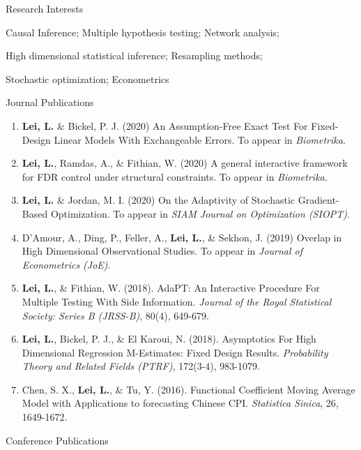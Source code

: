\documentclass{article}
\begin{document}
\begin{large}
\noindent Research Interests
\end{large}

\vspace{3mm}
Causal Inference; Multiple hypothesis testing; Network analysis; 

High dimensional statistical inference; Resampling methods;

Stochastic optimization; Econometrics

\vspace{3mm}

\begin{large}
\noindent Journal Publications
\end{large}

\begin{enumerate}
\item \textbf{Lei, L.} \& Bickel, P. J. (2020) An Assumption-Free Exact Test For Fixed-Design Linear Models With Exchangeable Errors. To appear in \emph{Biometrika}.
\item \textbf{Lei, L.}, Ramdas, A., \& Fithian, W. (2020) A general interactive framework for FDR control under structural constraints. To appear in \emph{Biometrika}.
\item \textbf{Lei, L.} \& Jordan, M. I. (2020) On the Adaptivity of Stochastic Gradient-Based Optimization. To appear in \emph{SIAM Journal on Optimization (SIOPT)}.
\item D'Amour, A., Ding, P., Feller, A., \textbf{Lei, L.}, \& Sekhon, J. (2019) Overlap in High Dimensional Observational Studies. To appear in \emph{Journal of Econometrics (JoE)}.
\item \textbf{Lei, L.}, \& Fithian, W. (2018). AdaPT: An Interactive Procedure For Multiple Testing With Side Information. \emph{Journal of the Royal Statistical Society: Series B (JRSS-B)}, 80(4), 649-679.
\item \textbf{Lei, L.}, Bickel, P. J., \& El Karoui, N. (2018). Asymptotics For High Dimensional Regression M-Estimates: Fixed Design Results. \emph{Probability Theory and Related Fields (PTRF)}, 172(3-4), 983-1079.
\item Chen, S. X., \textbf{Lei, L.}, \& Tu, Y. (2016). Functional Coefficient Moving Average Model with Applications to forecasting Chinese CPI. \emph{Statistica Sinica}, 26, 1649-1672.
\end{enumerate}

\begin{large}
\noindent Conference Publications
\end{large}
\end{document}
